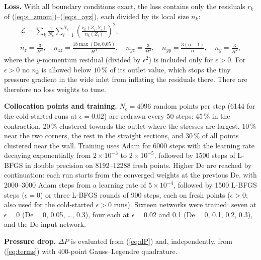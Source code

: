 \documentclass[11pt,a4paper]{article}
\newcommand{\De}{\mathrm{De}}
\begin{document}
\textbf{Loss.} With all boundary conditions exact, the loss contains only the residuals $r_k$ of (\ref{eq:s_zmom})--(\ref{eq:s_ayz}), each divided by its local size $n_k$:
\begin{equation}
\begin{gathered}
\mathcal L=\sum_{k}\frac1{N_c}\sum_{i=1}^{N_c}\left(\frac{r_k(Z_i,Y_i)}{n_k(Z_i)}\right)^2,\\
n_z=\frac{3}{H^3},\quad n_{zz}=\frac{18\max(\De,0.05)}{H^4},\quad n_{yz}=\frac{3}{H^2},\quad n_{yy}=\frac{3(\alpha-1)}{\alpha},\quad n_y=\frac{3}{H^2},
\end{gathered}
\label{eq:loss}
\end{equation}
where the $y$-momentum residual (divided by $\epsilon^2$) is included only for $\epsilon>0$. For $\epsilon>0$ no $n_k$ is allowed below $10\,\%$ of its outlet value, which stops the tiny pressure gradient in the wide inlet from inflating the residuals there. There are therefore no loss weights to tune.

\textbf{Collocation points and training.} $N_c=4096$ random points per step (6144 for the cold-started runs at $\epsilon=0.02$) are redrawn every 50 steps: 45\,\% in the contraction, 20\,\% clustered towards the outlet where the stresses are largest, 10\,\% near the two corners, the rest in the straight sections, and 30\,\% of all points clustered near the wall. Training uses Adam \cite{kingma2015} for 6000 steps with the learning rate decaying exponentially from $2\times10^{-3}$ to $2\times10^{-5}$, followed by 1500 steps of L-BFGS \cite{liu1989} in double precision on 8192--12288 fresh points. Higher $\De$ are reached by continuation: each run starts from the converged weights at the previous $\De$, with 2000--3000 Adam steps from a learning rate of $5\times10^{-4}$, followed by 1500 L-BFGS steps ($\epsilon=0$) or three L-BFGS rounds of 900 steps, each on fresh points ($\epsilon>0$; also used for the cold-started $\epsilon>0$ runs). Sixteen networks were trained: seven at $\epsilon=0$ ($\De=0$, 0.05, \dots, 0.3), four each at $\epsilon=0.02$ and 0.1 ($\De=0$, 0.1, 0.2, 0.3), and the $\De$-input network.

\textbf{Pressure drop.} $\Delta P$ is evaluated from (\ref{eq:dP}) and, independently, from (\ref{eq:terms}) with 400-point Gauss--Legendre quadrature.
\end{document}
